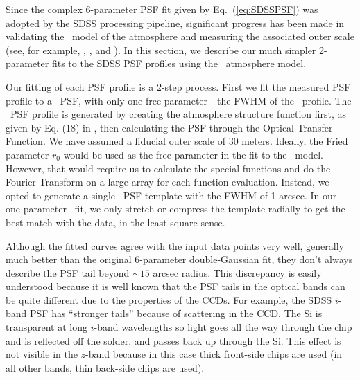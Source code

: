 

Since the complex 6-parameter PSF fit given by Eq.~(\ref{eq:SDSSPSF}) was adopted by 
the SDSS processing pipeline, significant progress has been made in validating the 
\vk~model of the atmosphere and measuring the associated outer
scale (see, for example, \citealt{Tokovinin2002}, \citealt{Boccas2004}, and \citealt{MartinezMessenger}).
In this section, we describe our much simpler 2-parameter fits to the SDSS PSF
profiles using the \vk~atmosphere model.

Our fitting of each PSF profile is a 2-step process. First we fit the
measured PSF profile to a \vk~PSF, with only one free parameter -
the FWHM of the \vk~profile.  The \vk~PSF profile is generated by creating the atmosphere
structure function first, as given by Eq. (18) in \cite{Tokovinin2002}, then calculating the
PSF through the Optical Transfer Function. We have assumed a fiducial
outer scale of 30 meters.
Ideally, the Fried parameter $r_0$ would be used as the free
parameter in the fit to the \vk~model. However, 
that would require us to calculate the special functions and do the
Fourier Transform on a large array for each function evaluation.
Instead, we opted to generate a single \vk~PSF template with the FWHM of 
1 arcsec. In our one-parameter \vk~fit, we only stretch or compress
the template radially to get the best match with the data, in the
least-square sense.


Although the fitted
curves agree with the input data points very well, generally much better than the
original 6-parameter double-Gaussian fit, they don't always describe
the PSF tail beyond $\sim 15$ arcsec radius. This discrepancy is easily understood
because it is well known that the PSF tails in the optical bands can be quite
different due to the properties of the CCDs.
For example, the SDSS $i$-band PSF has ``stronger tails''
because of scattering in the CCD.  The Si is transparent at long $i$-band wavelengths 
so light goes all the way through the chip and is reflected off the solder, and passes 
back up through the Si. This effect is not visible in the $z$-band because in this case
thick front-side chips are used (in all other bands, thin back-side chips are used). 

